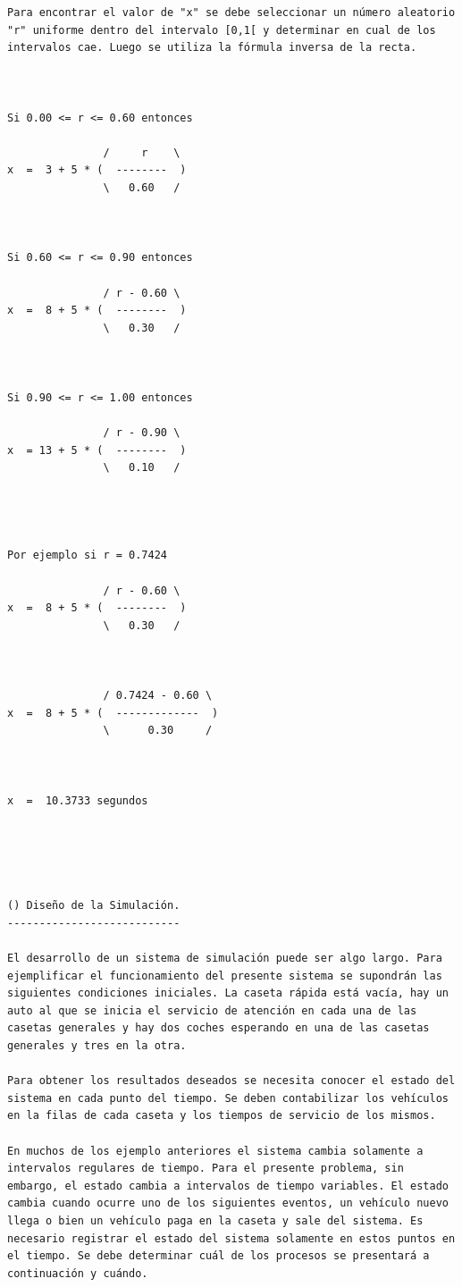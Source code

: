 \begin{verbatim}
Para encontrar el valor de "x" se debe seleccionar un número aleatorio "r" uniforme dentro del intervalo [0,1[ y determinar en cual de los intervalos cae. Luego se utiliza la fórmula inversa de la recta.



Si 0.00 <= r <= 0.60 entonces

               /     r    \
x  =  3 + 5 * (  --------  )
               \   0.60   /



Si 0.60 <= r <= 0.90 entonces

               / r - 0.60 \
x  =  8 + 5 * (  --------  )
               \   0.30   /



Si 0.90 <= r <= 1.00 entonces

               / r - 0.90 \
x  = 13 + 5 * (  --------  )
               \   0.10   /




Por ejemplo si r = 0.7424

               / r - 0.60 \
x  =  8 + 5 * (  --------  )
               \   0.30   /



               / 0.7424 - 0.60 \
x  =  8 + 5 * (  -------------  )
               \      0.30     /



x  =  10.3733 segundos





() Diseño de la Simulación.
---------------------------

El desarrollo de un sistema de simulación puede ser algo largo. Para ejemplificar el funcionamiento del presente sistema se supondrán las siguientes condiciones iniciales. La caseta rápida está vacía, hay un auto al que se inicia el servicio de atención en cada una de las casetas generales y hay dos coches esperando en una de las casetas generales y tres en la otra. 

Para obtener los resultados deseados se necesita conocer el estado del sistema en cada punto del tiempo. Se deben contabilizar los vehículos en la filas de cada caseta y los tiempos de servicio de los mismos. 

En muchos de los ejemplo anteriores el sistema cambia solamente a intervalos regulares de tiempo. Para el presente problema, sin embargo, el estado cambia a intervalos de tiempo variables. El estado cambia cuando ocurre uno de los siguientes eventos, un vehículo nuevo llega o bien un vehículo paga en la caseta y sale del sistema. Es necesario registrar el estado del sistema solamente en estos puntos en el tiempo. Se debe determinar cuál de los procesos se presentará a continuación y cuándo. 


\end{verbatim}
